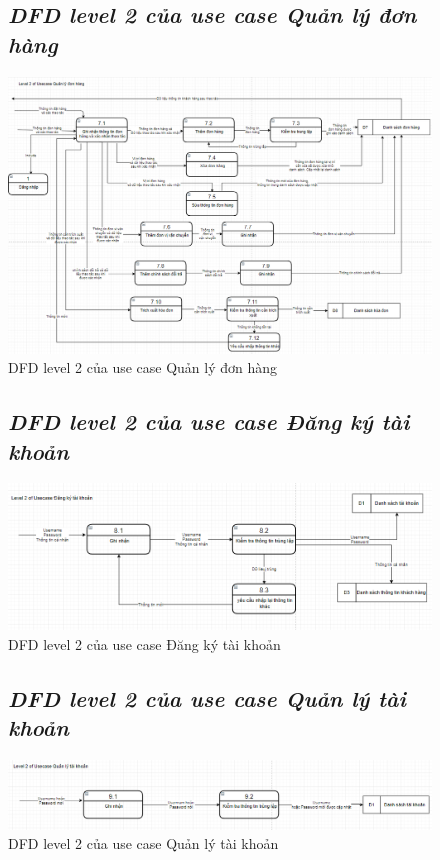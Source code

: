 \documentclass{report}
\begin{document}
\begin{figure}[htp]
    \subsection{\textit{DFD level 2 của use case Quản lý đơn hàng}}
    \centering
    \includegraphics[scale = 0.6]{image/DFD_level2_qldh.PNG}
    \caption{DFD level 2 của use case Quản lý đơn hàng}
\end{figure}

\begin{figure}[htp]
    \subsection{\textit{DFD level 2 của use case Đăng ký tài khoản}}
    \centering
    \includegraphics[scale = 0.6]{image/DFD_level2_dktk.PNG}
    \caption{DFD level 2 của use case Đăng ký tài khoản}
\end{figure}

\begin{figure}[htp]
    \subsection{\textit{DFD level 2 của use case Quản lý tài khoản}}
    \centering
    \includegraphics[scale = 0.6]{image/DFD_level2_qltk.PNG}
    \caption{DFD level 2 của use case Quản lý tài khoản}
\end{figure}
\end{document}
